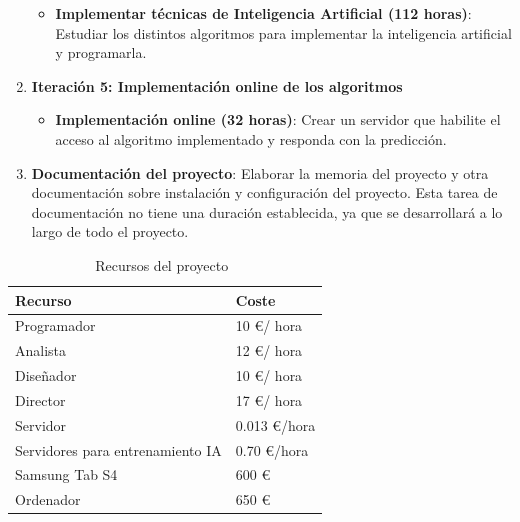 \begin{enumerate}
\begin{itemize}
        \item \textbf{Implementar técnicas de Inteligencia Artificial (112 horas)}: Estudiar los distintos algoritmos para implementar la inteligencia artificial y programarla.
    
    \end{itemize}
    
    \item \textbf{Iteración 5:  Implementación online de los algoritmos}
        \begin{itemize}
            \item \textbf{Implementación online (32 horas)}: Crear un servidor que habilite el acceso al algoritmo implementado y responda con la predicción.
        \end{itemize}

    \item \textbf{Documentación del proyecto}: Elaborar la memoria del proyecto y otra documentación sobre instalación y configuración del proyecto. Esta tarea de documentación no tiene una duración establecida, ya que se desarrollará a lo largo de todo el proyecto.
    
\end{enumerate}


\begin{table}[!h]
    \centering
    \begin{tabular}{l l}
        \toprule
         Recurso & Coste~\cite{boe} \\
        \midrule
         Programador    &  10 \euro / hora \\
         Analista       &  12 \euro / hora \\
         Diseñador      &  10 \euro / hora \\
         Director       & 17 \euro / hora \\
         Servidor       & 0.013 \euro /hora \\
         Servidores para entrenamiento IA   &  0.70 \euro /hora \\
         Samsung Tab S4 & 600 \euro   \\
         Ordenador      & 650 \euro \\
        \bottomrule
    \end{tabular}
    \caption[Recursos del proyecto]{Recursos del proyecto~\protect\footnotemark}
    \label{tab:recurso}
\end{table}


